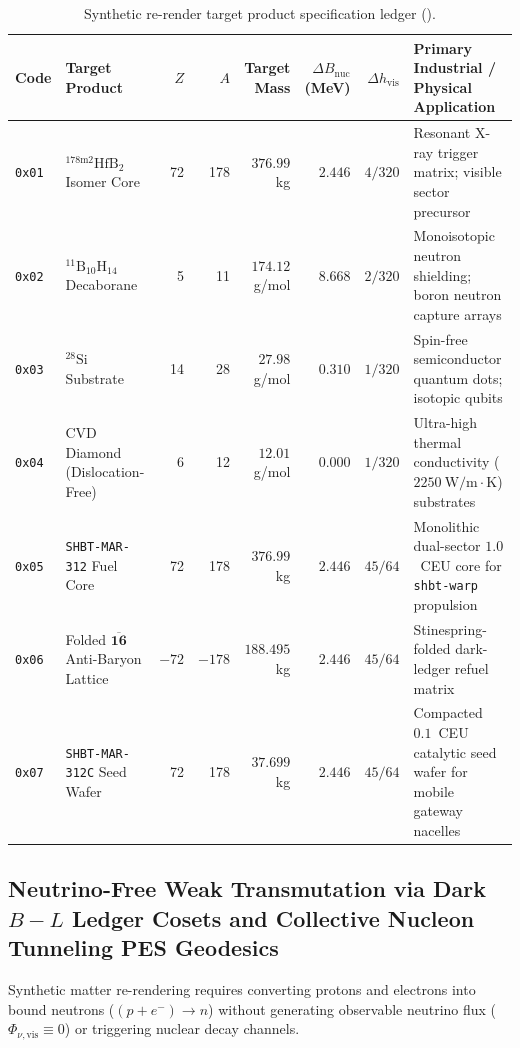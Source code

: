 \documentclass[11pt,onecolumn]{article}
\begin{document}
\begin{table}[!htbp]
\centering\scriptsize
\caption[Synthetic re-render target product specification ledger]{Synthetic re-render target product specification ledger ().}
\label{tab:synth_targets}
\begin{tabularx}{\textwidth}{@{}l l r r r r r >{\raggedright\arraybackslash}X@{}}
\toprule
Code & Target Product & $Z$ & $A$ & Target Mass & $\Delta B_{\text{nuc}}$ (MeV) & $\Delta h_{\text{vis}}$ & Primary Industrial / Physical Application \\
\midrule
\texttt{0x01} & $^{178\text{m}2}\text{HfB}_2$ Isomer Core & 72 & 178 & $376.99$~kg & $2.446$ & $4/320$ & Resonant X-ray trigger matrix; visible sector precursor \\
\texttt{0x02} & $^{11}\text{B}_{10}\text{H}_{14}$ Decaborane & 5 & 11 & $174.12$~g/mol & $8.668$ & $2/320$ & Monoisotopic neutron shielding; boron neutron capture arrays \\
\texttt{0x03} & $^{28}\text{Si}$ Substrate & 14 & 28 & $27.98$~g/mol & $0.310$ & $1/320$ & Spin-free semiconductor quantum dots; isotopic qubits \\
\texttt{0x04} & CVD Diamond (Dislocation-Free) & 6 & 12 & $12.01$~g/mol & $0.000$ & $1/320$ & Ultra-high thermal conductivity ($2250~\text{W/m}\cdot\text{K}$) substrates \\
\texttt{0x05} & \texttt{SHBT-MAR-312} Fuel Core & 72 & 178 & $376.99$~kg & $2.446$ & $45/64$ & Monolithic dual-sector $1.0$~CEU core for \texttt{shbt-warp} propulsion \\
\texttt{0x06} & Folded $\overline{\mathbf{16}}$ Anti-Baryon Lattice & $-72$ & $-178$ & $188.495$~kg & $2.446$ & $45/64$ & Stinespring-folded dark-ledger refuel matrix \\
\texttt{0x07} & \texttt{SHBT-MAR-312C} Seed Wafer & 72 & 178 & $37.699$~kg & $2.446$ & $45/64$ & Compacted $0.1$~CEU catalytic seed wafer for mobile gateway nacelles \\
\bottomrule
\end{tabularx}
\end{table}

\FloatBarrier
\subsection[Neutrino-Free Weak Transmutation via Dark B-L Ledger Cosets and Collective PES Geodesics]{Neutrino-Free Weak Transmutation via Dark \texorpdfstring{$B-L$}{B-L} Ledger Cosets and Collective Nucleon Tunneling PES Geodesics}
\label{subsec:weak_transmutation_pes}
Synthetic matter re-rendering requires converting protons and electrons into bound neutrons ($(p + e^-) \to n$) without generating observable neutrino flux ($\Phi_{\nu,\text{vis}} \equiv 0$) or triggering nuclear decay channels.
\end{document}
